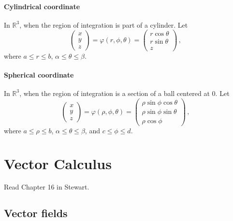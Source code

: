 \documentclass[
]{article}
\theoremstyle{definition}
\theoremstyle{definition}
\theoremstyle{definition}
\theoremstyle{definition}
\theoremstyle{remark}
\begin{document}
\paragraph{Cylindrical coordinate}\label{cylindrical-coordinate}

In \(\mathbb{R}^3\), when the region of integration is part of a cylinder.
Let
\begin{equation*}
    \begin{pmatrix}
        x \\ y \\z
    \end{pmatrix}
    =
    \varphi(r,\phi,\theta) = 
    \begin{pmatrix}
        r\cos\theta\\
        r\sin\theta\\
        z
    \end{pmatrix} \,,
\end{equation*}
where \(a \leq r \leq b\), \(\alpha \leq \theta \leq \beta\).

\paragraph{Spherical coordinate}\label{spherical-coordinate}

In \(\mathbb{R}^3\), when the region of integration is a section of a ball centered at \(0\).
Let
\begin{equation*}
    \begin{pmatrix}
        x \\ y \\z
    \end{pmatrix}
    =
    \varphi(\rho,\phi,\theta) = 
    \begin{pmatrix}
        \rho\sin\phi\cos\theta\\
        \rho\sin\phi\sin\theta\\
        \rho \cos\phi
    \end{pmatrix} \,,
\end{equation*}
where \(a \leq \rho \leq b\), \(\alpha \leq \theta \leq \beta\), and
\(c \leq \phi \leq d\).

\newpage

\section{Vector Calculus}\label{vector-calculus}

Read Chapter 16 in Stewart.

\subsection{Vector fields}\label{vector-fields}
\end{document}

